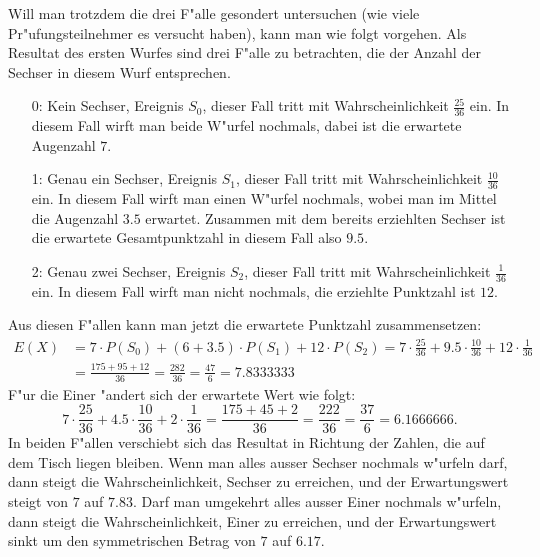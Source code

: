 \begin{loesung}
Will man trotzdem die drei F"alle gesondert untersuchen (wie
viele Pr"ufungsteilnehmer es versucht haben), kann man wie
folgt vorgehen.
Als Resultat des ersten Wurfes sind drei F"alle zu betrachten, die
der Anzahl der Sechser in diesem Wurf entsprechen.
\begin{itemize}
\item[0:] Kein Sechser, Ereignis $S_0$, dieser Fall tritt mit Wahrscheinlichkeit
$\frac{25}{36}$ ein.  In diesem Fall wirft man beide W"urfel nochmals,
dabei ist die erwartete Augenzahl $7$.
\item[1:] Genau ein Sechser, Ereignis $S_1$,
dieser Fall tritt mit Wahrscheinlichkeit
$\frac{10}{36}$ ein.  In diesem Fall wirft man einen W"urfel nochmals,
wobei man im Mittel die Augenzahl $3.5$ erwartet.  Zusammen mit dem
bereits erziehlten Sechser ist die erwartete Gesamtpunktzahl in diesem
Fall also $9.5$.
\item[2:] Genau zwei Sechser, Ereignis $S_2$,
dieser Fall tritt mit Wahrscheinlichkeit
$\frac{1}{36}$ ein.  In diesem Fall wirft man nicht nochmals, die
erziehlte Punktzahl ist $12$.
\end{itemize}
Aus diesen F"allen kann man jetzt die erwartete Punktzahl zusammensetzen:
\begin{align*}
E(X)&=
7 \cdot P(S_0) + (6 + 3.5)\cdot P(S_1) + 12\cdot P(S_2)
=
7\cdot \frac{25}{36}
+
9.5\cdot \frac{10}{36}
+
12\cdot\frac{1}{36}
\\
&=
\frac{175+95+12}{36}=\frac{282}{36}=\frac{47}{6}
=7.8333333
\end{align*}
F"ur die Einer "andert sich der erwartete Wert wie folgt:
\[
7\cdot \frac{25}{36}
+
4.5\cdot \frac{10}{36}
+
2\cdot\frac{1}{36}
=
\frac{175+45+2}{36}=\frac{222}{36}=\frac{37}{6}
=6.1666666.
\]
In beiden F"allen verschiebt sich das Resultat in Richtung der Zahlen,
die auf dem Tisch liegen bleiben. Wenn man alles ausser Sechser nochmals
w"urfeln darf, dann steigt die Wahrscheinlichkeit, Sechser zu erreichen,
und der Erwartungswert steigt von $7$ auf $7.83$. Darf man umgekehrt alles
ausser Einer nochmals w"urfeln, dann steigt die Wahrscheinlichkeit,
Einer zu erreichen, und der Erwartungswert sinkt um den symmetrischen Betrag
von $7$ auf $6.17$.
\end{loesung}

